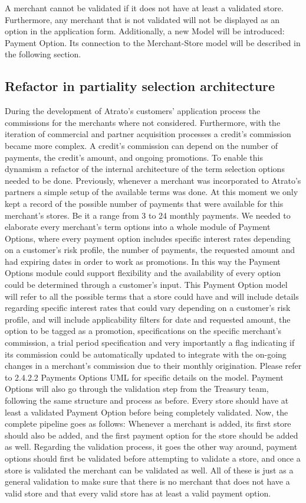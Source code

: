 A merchant cannot be validated if it does not have at least a validated store. Furthermore, any merchant that is not validated will not be displayed as an option in the application form.  Additionally, a new Model will be introduced: Payment Option. Its connection to the Merchant-Store model will be described in the following section.

\subsection{Refactor in partiality selection architecture}
During the development of Atrato’s customers’ application process the commissions for the merchants where not considered. Furthermore, with the iteration of commercial and partner acquisition processes a credit’s commission became more complex. A credit’s commission can depend on the number of payments, the credit’s amount, and ongoing promotions. To enable this dynamism a refactor of the internal architecture of the term selection options needed to be done.
Previously, whenever a merchant was incorporated to Atrato’s partners a simple setup of the available terms was done. At this moment we only kept a record of the possible number of payments that were available for this merchant’s stores. Be it a range from 3 to 24 monthly payments. We needed to elaborate every merchant’s term options into a whole module of Payment Options, where every payment option includes specific interest rates depending on a customer’s risk profile, the number of payments, the requested amount and had expiring dates in order to work as promotions. In this way the Payment Options module could support flexibility and the availability of every option could be determined through a customer’s input. 
This Payment Option model will refer to all the possible terms that a store could have and will include details regarding specific interest rates that could vary depending on a customer’s risk profile, and will include applicability filters for date and requested amount, the option to be tagged as a promotion, specifications on the specific merchant’s commission, a trial period specification and very importantly a flag indicating if its commission could be automatically updated to integrate with the on-going changes in a merchant’s commission due to their monthly origination. Please refer to 2.4.2.2 Payments Options UML for specific details on the model.
Payment Options will also go through the validation step from the Treasury team, following the same structure and process as before. Every store should have at least a validated Payment Option before being completely validated. Now, the complete pipeline goes as follows: 
Whenever a merchant is added, its first store should also be added, and the first payment option for the store should be added as well. Regarding the validation process, it goes the other way around, payment options should first be validated before attempting to validate a store, and once a store is validated the merchant can be validated as well. All of these is just as a general validation to make sure that there is no merchant that does not have a valid store and that every valid store has at least a valid payment option.

